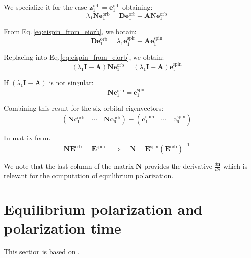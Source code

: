 We specialize it for the case $\bm{z}_1^{\text{orb}} = \bm{e}_1^{\text{orb}}$ obtaining:
\begin{equation}
\lambda_1 \mathbf{N} \bm{e}_1^{\text{orb}} = \mathbf{D} \bm{e}_1^{\text{orb}} + \mathbf{A} \mathbf{N} \bm{e}_1^{\text{orb}}
\label{eq:isf_e1}
\end{equation}

From Eq.\,\ref{eq:eispin_from_eiorb}, we botain:
\begin{equation}
\mathbf{D} \bm{e}_1^{\text{orb}} = \lambda_1 \bm{e}_1^{\text{spin}} - \mathbf{A} \bm{e}_1^{\text{spin}}
\end{equation}

Replacing into Eq.\,\ref{eq:eispin_from_eiorb}, we obtain:
\begin{equation}
(\lambda_1 \mathbf{I} - \mathbf{A}) \mathbf{N} \bm{e}_1^{\text{orb}} = (\lambda_1 \mathbf{I} - \mathbf{A}) \bm{e}_1^{\text{spin}}
\end{equation}

If $(\lambda_1 \mathbf{I} - \mathbf{A})$ is not singular:
\begin{equation}
\mathbf{N} \bm{e}_1^{\text{orb}} = \bm{e}_1^{\text{spin}}
\end{equation}

Combining this result for the six orbital eigenvectors:
\begin{equation}
\left( \mathbf{N} \bm{e}_1^{\text{orb}} \quad \cdots \quad \mathbf{N} \bm{e}_6^{\text{orb}} \right)
= 
\left( \bm{e}_1^{\text{spin}} \quad \cdots \quad \bm{e}_6^{\text{spin}} \right)
\end{equation}

In matrix form:
\begin{equation}
\mathbf{N} \mathbf{E}^{\text{orb}} = \mathbf{E}^{\text{spin}} 
\quad \Rightarrow \quad 
\mathbf{N} = \mathbf{E}^{\text{spin}} \left( \mathbf{E}^{\text{orb}} \right)^{-1}
\end{equation}

We note that the last column of the matrix $\bm{N}$ provides the derivative $\frac{d \bm{n}}{d \delta}$ which is relevant for the computation of equilibrium polarization.

\section{Equilibrium polarization and polarization time}

This section is based on \cite{Chao:1980fz, Derbenev:1973ia, Boge:1994we, Sagan:BmadManual, Mane:1986qy, Barber:1999xm}.

